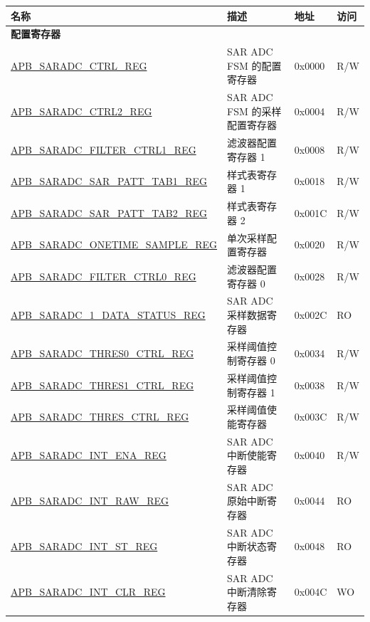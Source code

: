 \begin{longtable}{ | p{7cm} | p{5.2cm} | p{1.3cm} | p{1cm} | }
\hline\rowcolor{lightgray}
\textbf{名称} & \textbf{描述} & \textbf{地址} & \textbf{访问} \\ \hline
\endhead
\multicolumn{4}{|l|}{\textbf{配置寄存器}} \\ \hline
\hyperref[regdesc:APBSARADCCTRLREG]{APB\_SARADC\_CTRL\_REG} & SAR ADC FSM 的配置寄存器& 0x0000 & R/W \\ \hline
\hyperref[regdesc:APBSARADCCTRL2REG]{APB\_SARADC\_CTRL2\_REG} & SAR ADC FSM 的采样配置寄存器 & 0x0004 & R/W \\ \hline
\hyperref[regdesc:APBSARADCFILTERCTRL1REG]{APB\_SARADC\_FILTER\_CTRL1\_REG} & 滤波器配置寄存器 1 & 0x0008 & R/W \\ \hline
\hyperref[regdesc:APBSARADCSARPATTTAB1REG]{APB\_SARADC\_SAR\_PATT\_TAB1\_REG} & 样式表寄存器 1 & 0x0018 & R/W \\ \hline
\hyperref[regdesc:APBSARADCSARPATTTAB2REG]{APB\_SARADC\_SAR\_PATT\_TAB2\_REG} & 样式表寄存器 2 & 0x001C & R/W \\ \hline
\hyperref[regdesc:APBSARADCONETIMESAMPLEREG]{APB\_SARADC\_ONETIME\_SAMPLE\_REG} & 单次采样配置寄存器 & 0x0020 & R/W \\ \hline
\hyperref[regdesc:APBSARADCFILTERCTRL0REG]{APB\_SARADC\_FILTER\_CTRL0\_REG} & 滤波器配置寄存器 0 & 0x0028 & R/W \\ \hline
\hyperref[regdesc:APBSARADCSAR1DATASTATUSREG]{APB\_SARADC\_1\_DATA\_STATUS\_REG} & SAR ADC 采样数据寄存器 & 0x002C & RO \\ \hline
\hyperref[regdesc:APBSARADCTHRES0CTRLREG]{APB\_SARADC\_THRES0\_CTRL\_REG} & 采样阈值控制寄存器 0 & 0x0034 & R/W \\ \hline
\hyperref[regdesc:APBSARADCTHRES1CTRLREG]{APB\_SARADC\_THRES1\_CTRL\_REG} & 采样阈值控制寄存器 1 & 0x0038 & R/W \\ \hline
\hyperref[regdesc:APBSARADCTHRESCTRLREG]{APB\_SARADC\_THRES\_CTRL\_REG} & 采样阈值使能寄存器 & 0x003C & R/W \\ \hline
\hyperref[regdesc:APBSARADCINTENAREG]{APB\_SARADC\_INT\_ENA\_REG} & SAR ADC 中断使能寄存器 & 0x0040 & R/W \\ \hline
\hyperref[regdesc:APBSARADCINTRAWREG]{APB\_SARADC\_INT\_RAW\_REG} & SAR ADC 原始中断寄存器 & 0x0044 & RO \\ \hline
\hyperref[regdesc:APBSARADCINTSTREG]{APB\_SARADC\_INT\_ST\_REG} & SAR ADC 中断状态寄存器 & 0x0048 & RO \\ \hline
\hyperref[regdesc:APBSARADCINTCLRREG]{APB\_SARADC\_INT\_CLR\_REG} & SAR ADC 中断清除寄存器 & 0x004C & WO \\ \hline

\end{longtable}
